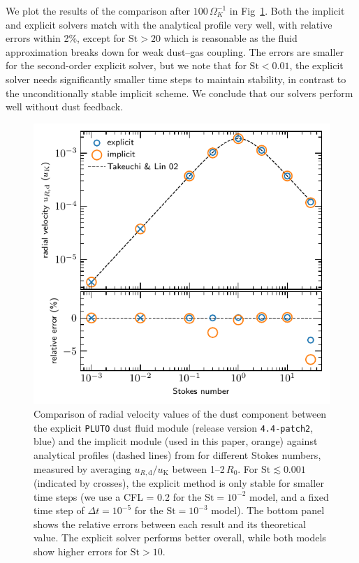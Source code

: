 \documentclass[fleqn,usenatbib,useAMS]{mnras}
\newcommand{\vK}{u_\mathrm{K}}
\newcommand{\St}{\mathrm{St}}
\newcommand{\pluto}{\texttt{PLUTO}}
\begin{document}
We plot the results of the comparison after $100\,\Omega_K^{-1}$ in Fig~\ref{fig:vdrift-plot}. Both the implicit and explicit solvers match with the analytical profile very well, with relative errors within 2\%, except for $\St > 20$ which is reasonable as the fluid approximation breaks down for weak dust--gas coupling. The errors are smaller for the second-order explicit solver, but we note that for $\St < 0.01$, the explicit solver needs significantly smaller time steps to maintain stability, in contrast to the unconditionally stable implicit scheme. We conclude that our solvers perform well without dust feedback.
\begin{figure}
	\centering
	\includegraphics[width=\columnwidth]{vdrift.pdf}
	\caption{Comparison of radial velocity values of the dust component between the explicit \pluto{} dust fluid module (release version \texttt{4.4-patch2}, blue) and the implicit module (used in this paper, orange) against analytical profiles (dashed lines) from \citet{takeuchi-lin-2002} for different Stokes numbers, measured by averaging $u_{R,\text{d}}/\vK$ between 1--2\,$R_0$. For $\St \lesssim 0.001$ (indicated by crosses), the explicit method is only stable for smaller time steps (we use a CFL = 0.2 for the $\St = 10^{-2}$ model, and a fixed time step of $\Delta t = 10^{-5}$ for the $\St = 10^{-3}$ model). The bottom panel shows the relative errors between each result and its theoretical value. The explicit solver performs better overall, while both models show higher errors for $\St > 10$.}
	\label{fig:vdrift-plot}
\end{figure}
\end{document}
